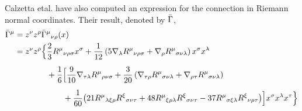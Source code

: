 \documentclass[a4paper,12pt]{article}
\numberwithin{equation}{section}%
\begin{document}
Calzetta etal.\cite{calzetta:1988-01} have also computed an expression for the connection in
Riemann normal coordinates. Their result, denoted by ${\bar{\Gamma}}$,
%
%
\begin{equation*}
   \begin{split}
      {\bar{\Gamma}}^{\mu}
      &= z^{\nu} z^{\rho} {\bar{\Gamma}}^{\mu}{}_{\nu\rho}(x)\\
      &= z^{\nu} z^{\rho} \Bigl\lbrace
           \frac{2}{3} R^{\mu}{}_{\nu\rho\sigma} x^{\sigma}
         + \frac{1}{12} \left(5 \nabla_{\lambda}{R^{\mu}{}_{\nu\rho\sigma}}
                              + \nabla_{\rho}{R^{\mu}{}_{\sigma\nu\lambda}}
                        \right) x^{\sigma} x^{\lambda}\\[5pt]
      &\qquad\qquad
         + \frac{1}{6}
            \Big[
               \frac{9}{10} \nabla_{\tau\lambda}{R^{\mu}{}_{\rho\nu\sigma}}
             + \frac{3}{20} \left(  \nabla_{\tau\rho}{R^{\mu}{}_{\sigma\nu\lambda}}
                                  + \nabla_{\rho\tau}{R^{\mu}{}_{\sigma\nu\lambda}}
                            \right)\\[5pt]
      &\qquad\qquad\qquad
             + \frac{1}{60}
               \bigl(  21 R^{\mu}{}_{\lambda\xi\rho} R^{\xi}{}_{\sigma\nu\tau}
                     + 48 R^{\mu}{}_{\xi\rho\lambda} R^{\xi}{}_{\sigma\nu\tau}
                     - 37 R^{\mu}{}_{\sigma\xi\lambda} R^{\xi}{}_{\nu\rho\tau}
               \bigr)
            \Big] x^{\sigma} x^{\lambda} x^{\tau} \Bigr\rbrace
   \end{split}
\end{equation*}
\end{document}
